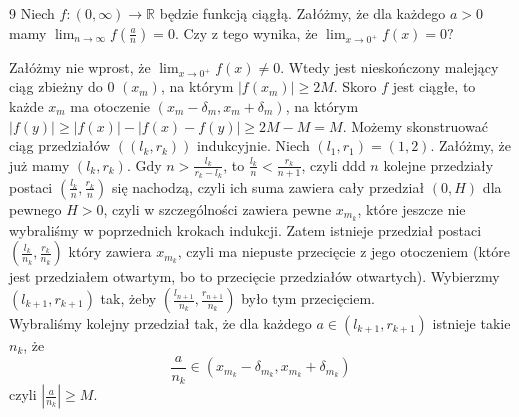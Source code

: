 \documentclass{../note}
\begin{document}
\begin{zadanie}{9}
Niech $f:(0,\infty)\rightarrow\mathbb{R}$ będzie funkcją ciągłą. Załóżmy, że dla każdego $a>0$ mamy $\lim_{n\rightarrow\infty}f\left(\frac{a}{n}\right)=0$. Czy z tego wynika, że $\lim_{x\rightarrow 0^{+}}f(x)=0?$
\end{zadanie}
\begin{rozwiazanie}
Załóżmy nie wprost, że $\lim_{x\rightarrow 0^{+}}f(x)\neq 0$. Wtedy jest nieskończony malejący ciąg zbieżny do 0 $(x_m)$, na którym $|f(x_m)| \geq 2M$. Skoro $f$ jest ciągłe, to każde $x_m$ ma otoczenie $(x_m - \delta_m, x_m + \delta_m)$, na którym $|f(y)| \geq |f(x)| - |f(x) - f(y)| \geq 2M - M = M$. Możemy skonstruować ciąg przedziałów $((l_k, r_k))$ indukcyjnie. Niech $(l_1, r_1) = (1, 2)$. Załóżmy, że już mamy $(l_k, r_k)$. Gdy $n > \frac{l_k}{r_k-l_k}$, to $\frac{l_k}{n} < \frac{r_k}{n+1}$, czyli ddd $n$ kolejne przedziały postaci $(\frac{l_k}{n}, \frac{r_k}{n})$ się nachodzą, czyli ich suma zawiera cały przedział $(0, H)$ dla pewnego $H>0$, czyli w szczególności zawiera pewne $x_{m_k}$, które jeszcze nie wybraliśmy w poprzednich krokach indukcji. Zatem istnieje przedział postaci $(\frac{l_k}{n_k}, \frac{r_k}{n_k})$ który zawiera $x_{m_k}$, czyli ma niepuste przecięcie z jego otoczeniem (które jest przedziałem otwartym, bo to przecięcie przedziałów otwartych). Wybierzmy $(l_{k+1}, r_{k+1})$ tak, żeby $(\frac{l_{n+1}}{n_k}, \frac{r_{n+1}}{n_k})$ było tym przecięciem.\\
Wybraliśmy kolejny przedział tak, że dla każdego $a \in (l_{k+1}, r_{k+1})$ istnieje takie $n_k$, że
\[\frac{a}{n_k} \in (x_{m_k} - \delta_{m_k}, x_{m_k} + \delta_{m_k})\]
czyli $|\frac{a}{n_k}| \geq M$.
\end{rozwiazanie}
\end{document}
